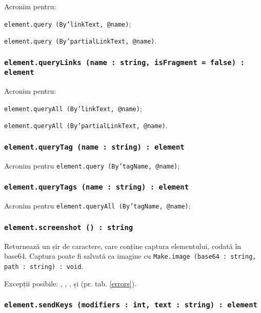 Acronim pentru:
\begin{icItems}
	\item \texttt{element.query (By'linkText, @name)};
	\item \texttt{element.query (By'partialLinkText, @name)}.
\end{icItems}

\subsubsection{\texttt{element.queryLinks (name : string, isFragment = false) : element}}

Acronim pentru:
\begin{icItems}
	\item \texttt{element.queryAll (By'linkText, @name)};
	\item \texttt{element.queryAll (By'partialLinkText, @name)}.
\end{icItems}

\subsubsection{\texttt{element.queryTag (name : string) : element}}

Acronim pentru \texttt{element.query (By'tagName, @name)};

\subsubsection{\texttt{element.queryTags (name : string) : element}}

Acronim pentru \texttt{element.queryAll (By'tagName, @name)};

\subsubsection{\texttt{element.screenshot () : string}}

Returnează un șir de caractere, care conține captura elementului, codată în base64. Captura poate fi salvată ca imagine cu \texttt{Make.image (base64 : string, path : string) : void}.

Excepții posibile: , , ,  și  (pr. tab. \ref{errors}).

\subsubsection{\texttt{element.sendKeys (modifiers : int, text : string) : element}}

